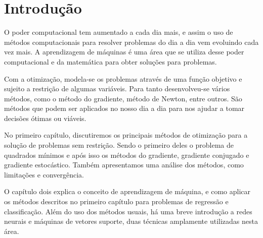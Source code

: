\documentclass[
	12pt,				%
    oneside,			%
	a4paper,			%
	english,			%
	french,				%
	spanish,			%
	brazil,				%
	]{abntex2}
\begin{document}




\tableofcontents*


\textual


\chapter{Introdução} %

    O poder computacional tem aumentado a cada dia mais, e assim o uso de métodos computacionais para resolver problemas do dia a dia vem evoluindo cada vez mais. A aprendizagem de máquinas é uma área que se utiliza desse poder computacional e da matemática para obter soluções para problemas.

    Com a otimização, modela-se os problemas através de uma função objetivo e sujeito a restrição de algumas variáveis. Para tanto desenvolveu-se vários métodos, como o método do gradiente, método de Newton, entre outros. São métodos que podem ser aplicados no nosso dia a dia para nos ajudar a tomar decisões ótimas ou viáveis.

    No primeiro capítulo, discutiremos os principais métodos de otimização para a solução de problemas sem restrição. Sendo o primeiro deles o problema de quadrados mínimos e após isso os métodos do gradiente, gradiente conjugado e gradiente estocástico. Também apresentamos uma análise dos métodos, como limitações e convergência.

    O capítulo dois explica o conceito de aprendizagem de máquina, e como aplicar os métodos descritos no primeiro capítulo para problemas de regressão e classificação. Além do uso dos métodos usuais, há uma breve introdução a redes neurais e máquinas de vetores suporte, duas técnicas amplamente utilizadas nesta área.
\end{document}
